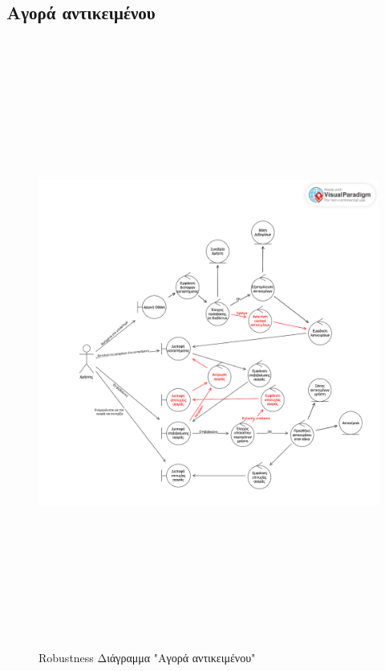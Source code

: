 \subsection{Αγορά αντικειμένου}
\begin{figure}[!htb]
  \begin{center}
    \includegraphics[width=18cm,height=20cm]{robust_shop.png}
    \caption{Robustness Διάγραμμα "Αγορά αντικειμένου"}
    \label{}
     \end{center}
\end{figure}
\newpage


